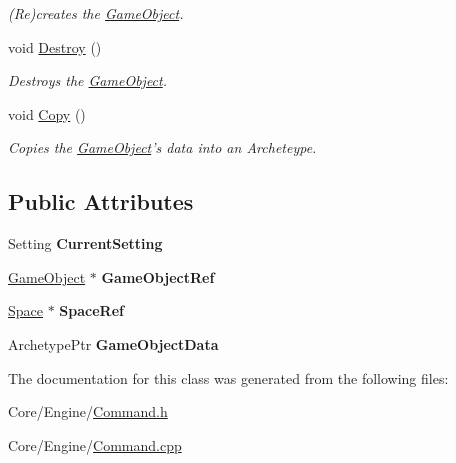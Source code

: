 \begin{DoxyCompactItemize}
\begin{DoxyCompactList}\small\item\em (Re)creates the \hyperlink{classDCEngine_1_1GameObject}{Game\-Object}. \end{DoxyCompactList}\item 
\hypertarget{classDCEngine_1_1CommandObjectCreation_aa12c1f9d71af2b76f6959129b74ea848}{void \hyperlink{classDCEngine_1_1CommandObjectCreation_aa12c1f9d71af2b76f6959129b74ea848}{Destroy} ()}\label{classDCEngine_1_1CommandObjectCreation_aa12c1f9d71af2b76f6959129b74ea848}

\begin{DoxyCompactList}\small\item\em Destroys the \hyperlink{classDCEngine_1_1GameObject}{Game\-Object}. \end{DoxyCompactList}\item 
\hypertarget{classDCEngine_1_1CommandObjectCreation_ab54719033edf413729904e89a2bfacc1}{void \hyperlink{classDCEngine_1_1CommandObjectCreation_ab54719033edf413729904e89a2bfacc1}{Copy} ()}\label{classDCEngine_1_1CommandObjectCreation_ab54719033edf413729904e89a2bfacc1}

\begin{DoxyCompactList}\small\item\em Copies the \hyperlink{classDCEngine_1_1GameObject}{Game\-Object}'s data into an Archeteype. \end{DoxyCompactList}\end{DoxyCompactItemize}
\subsection*{Public Attributes}
\begin{DoxyCompactItemize}
\item 
\hypertarget{classDCEngine_1_1CommandObjectCreation_a89067b099fcda02f3c2e6363df151f4e}{Setting {\bfseries Current\-Setting}}\label{classDCEngine_1_1CommandObjectCreation_a89067b099fcda02f3c2e6363df151f4e}

\item 
\hypertarget{classDCEngine_1_1CommandObjectCreation_a1e2aeb29abedc520ded47357cafc19aa}{\hyperlink{classDCEngine_1_1GameObject}{Game\-Object} $\ast$ {\bfseries Game\-Object\-Ref}}\label{classDCEngine_1_1CommandObjectCreation_a1e2aeb29abedc520ded47357cafc19aa}

\item 
\hypertarget{classDCEngine_1_1CommandObjectCreation_a50e2a97172026832eed0c7ff22595e00}{\hyperlink{classDCEngine_1_1Space}{Space} $\ast$ {\bfseries Space\-Ref}}\label{classDCEngine_1_1CommandObjectCreation_a50e2a97172026832eed0c7ff22595e00}

\item 
\hypertarget{classDCEngine_1_1CommandObjectCreation_a9829c69701dc89e92054fa42e0b961a6}{Archetype\-Ptr {\bfseries Game\-Object\-Data}}\label{classDCEngine_1_1CommandObjectCreation_a9829c69701dc89e92054fa42e0b961a6}

\end{DoxyCompactItemize}


The documentation for this class was generated from the following files\-:\begin{DoxyCompactItemize}
\item 
Core/\-Engine/\hyperlink{Command_8h}{Command.\-h}\item 
Core/\-Engine/\hyperlink{Command_8cpp}{Command.\-cpp}\end{DoxyCompactItemize}
